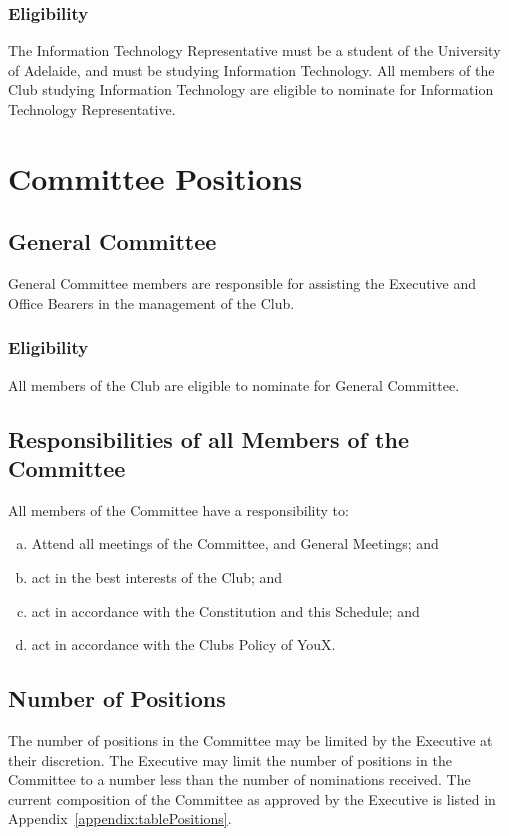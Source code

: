 \documentclass[11pt]{report}
\begin{document}
\subsection{Eligibility}
The Information Technology Representative must be a student of the University of Adelaide, and must be studying Information Technology. All members of the Club studying Information Technology are eligible to nominate for Information Technology Representative.

\chapter{Committee Positions}
\section{General Committee}
General Committee members are responsible for assisting the Executive and Office Bearers in the management of the Club. 
\subsection{Eligibility}
All members of the Club are eligible to nominate for General Committee.

\section{Responsibilities of all Members of the Committee}
All members of the Committee have a responsibility to:
\begin{enumerate}[(a)]
    \item Attend all meetings of the Committee, and General Meetings; and
    \item act in the best interests of the Club; and
    \item act in accordance with the Constitution and this Schedule; and
    \item act in accordance with the Clubs Policy of YouX.
\end{enumerate}

\section{Number of Positions}
The number of positions in the Committee may be limited by the Executive at their discretion. The Executive may limit the number of positions in the Committee to a number less than the number of nominations received. The current composition of the Committee as approved by the Executive is listed in Appendix~\ref{appendix:tablePositions}.
\end{document}
